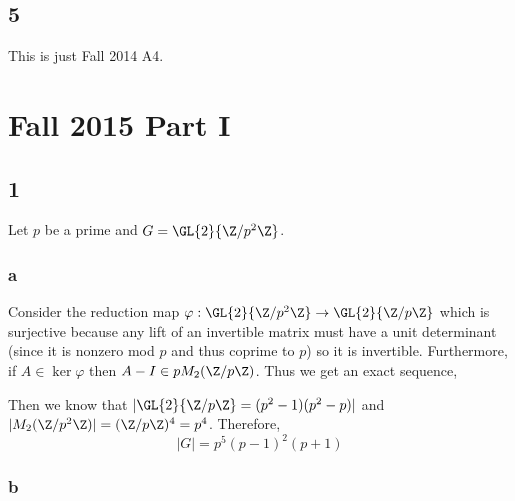 \documentclass[12pt]{article}
\begin{document}
\subsection{5}

This is just Fall 2014 A4.


\section{Fall 2015 Part I}

\subsection{1}

Let $p$ be a prime and $G = \GL{2}{\Z / p^2 \Z}$.

\subsubsection{a}

Consider the reduction map $\varphi : \GL{2}{\Z/p^2 \Z} \to \GL{2}{\Z / p \Z}$ which is surjective because any lift of an invertible matrix must have a unit determinant (since it is nonzero mod $p$ and thus coprime to $p$) so it is invertible. Furthermore, if $A \in \ker{\varphi}$ then $A - I \in p M_2(\Z / p \Z)$. Thus we get an exact sequence,
\begin{center}
\end{center}
Then we know that $|\GL{2}{\Z/p\Z} = (p^2 - 1)(p^2 - p)|$ and $|M_2(\Z / p^2 \Z)| = (\Z /p \Z)^4 = p^4$. Therefore,
\[ |G| = p^5 (p-1)^2 (p+1) \]

\subsubsection{b}
\end{document}
